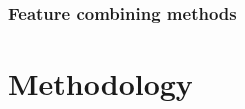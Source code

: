 \documentclass[draft,final]{vutinfth} %
\begin{document}
\subsection{Feature combining methods}

\chapter{Methodology}




\backmatter

\listoffigures %

\cleardoublepage %
\listoftables %

\listofalgorithms
{}

\printindex

\printglossaries



\end{document}
